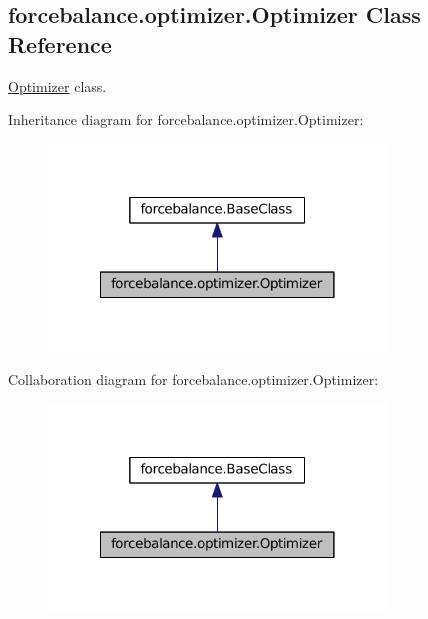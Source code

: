 \hypertarget{classforcebalance_1_1optimizer_1_1Optimizer}{\subsection{forcebalance.\-optimizer.\-Optimizer \-Class \-Reference}
\label{classforcebalance_1_1optimizer_1_1Optimizer}
}


\hyperlink{classforcebalance_1_1optimizer_1_1Optimizer}{\-Optimizer} class.  




\-Inheritance diagram for forcebalance.\-optimizer.\-Optimizer\-:\nopagebreak
\begin{figure}[H]
\begin{center}
\leavevmode
\includegraphics[width=254pt]{classforcebalance_1_1optimizer_1_1Optimizer__inherit__graph}
\end{center}
\end{figure}


\-Collaboration diagram for forcebalance.\-optimizer.\-Optimizer\-:\nopagebreak
\begin{figure}[H]
\begin{center}
\leavevmode
\includegraphics[width=254pt]{classforcebalance_1_1optimizer_1_1Optimizer__coll__graph}
\end{center}
\end{figure}
